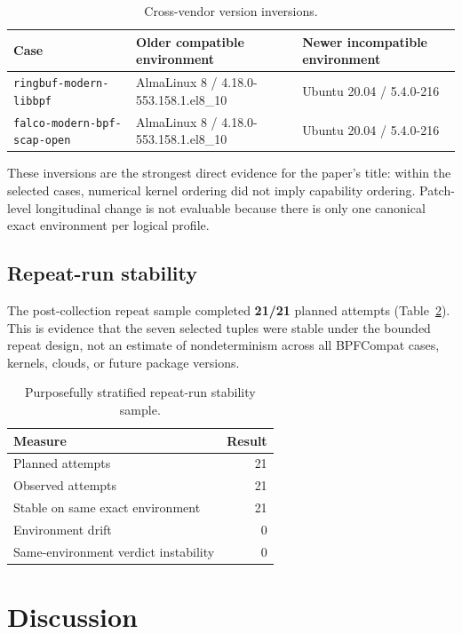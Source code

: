 \documentclass[10pt]{article}
\newcommand{\code}[1]{\texttt{#1}}
\begin{document}
\begin{table}[h]
\centering
\caption{Cross-vendor version inversions.}
\label{tab:inversions}
\small
\begin{tabularx}{\textwidth}{@{}l X X@{}}
\toprule
Case & Older compatible environment & Newer incompatible environment \\
\midrule
\code{ringbuf-modern-libbpf} & AlmaLinux 8 / 4.18.0-553.158.1.el8\_10 & Ubuntu 20.04 / 5.4.0-216 \\
\code{falco-modern-bpf-scap-open} & AlmaLinux 8 / 4.18.0-553.158.1.el8\_10 & Ubuntu 20.04 / 5.4.0-216 \\
\bottomrule
\end{tabularx}
\end{table}

These inversions are the strongest direct evidence for the paper's title: within the selected cases, numerical kernel ordering did not imply capability ordering. Patch-level longitudinal change is not evaluable because there is only one canonical exact environment per logical profile.

\subsection{Repeat-run stability}
The post-collection repeat sample completed \textbf{21/21} planned attempts (Table~\ref{tab:repeat}). This is evidence that the seven selected tuples were stable under the bounded repeat design, not an estimate of nondeterminism across all BPFCompat cases, kernels, clouds, or future package versions.

\begin{table}[h]
\centering
\caption{Purposefully stratified repeat-run stability sample.}
\label{tab:repeat}
\begin{tabular}{@{}lr@{}}
\toprule
Measure & Result \\
\midrule
Planned attempts & 21 \\
Observed attempts & 21 \\
Stable on same exact environment & 21 \\
Environment drift & 0 \\
Same-environment verdict instability & 0 \\
\bottomrule
\end{tabular}
\end{table}

\section{Discussion}
\end{document}
